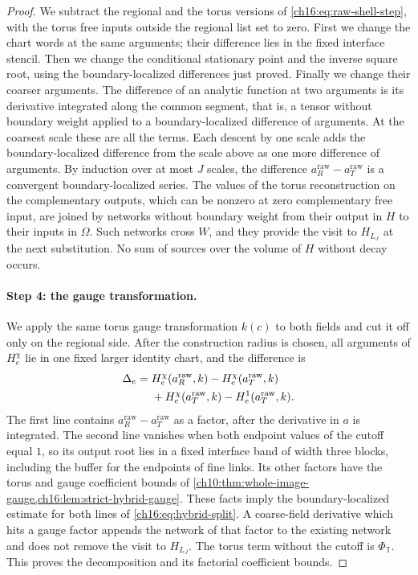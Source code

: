 \begin{proof}
We subtract the regional and the torus versions of \eqref{ch16:eq:raw-shell-step}, with the torus free inputs outside the regional list set to zero. First we change the chart words at the same arguments; their difference lies in the fixed interface stencil. Then we change the conditional stationary point and the inverse square root, using the boundary-localized differences just proved. Finally we change their coarser arguments. The difference of an analytic function at two arguments is its derivative integrated along the common segment, that is, a tensor without boundary weight applied to a boundary-localized difference of arguments. At the coarsest scale these are all the terms. Each descent by one scale adds the boundary-localized difference from the scale above as one more difference of arguments. By induction over at most $J$ scales, the difference $a_R^{\mathrm{raw}}-a_T^{\mathrm{raw}}$ is a convergent boundary-localized series. The values of the torus reconstruction on the complementary outputs, which can be nonzero at zero complementary free input, are joined by networks without boundary weight from their output in $H$ to their inputs in $\Omega$. Such networks cross $W$, and they provide the visit to $H_{L_J}$ at the next substitution. No sum of sources over the volume of $H$ without decay occurs.

\paragraph{Step 4: the gauge transformation.}
We apply the same torus gauge transformation $k(c)$ to both fields and cut it off only on the regional side. After the construction radius is chosen, all arguments of $H_e^\chi$ lie in one fixed larger identity chart, and the difference is
\begin{align}
 \Delta_e={}&H_e^\chi(a_R^{\mathrm{raw}},k)-H_e^\chi(a_T^{\mathrm{raw}},k)
                                                        \notag\\
            &+H_e^\chi(a_T^{\mathrm{raw}},k)-H_e^1(a_T^{\mathrm{raw}},k).
                                                        \label{ch16:eq:hybrid-split}
\end{align}
The first line contains $a_R^{\mathrm{raw}}-a_T^{\mathrm{raw}}$ as a factor, after the derivative in $a$ is integrated. The second line vanishes when both endpoint values of the cutoff equal $1$, so its output root lies in a fixed interface band of width three blocks, including the buffer for the endpoints of fine links. Its other factors have the torus and gauge coefficient bounds of \cref{ch10:thm:whole-image-gauge,ch16:lem:strict-hybrid-gauge}. These facts imply the boundary-localized estimate for both lines of \eqref{ch16:eq:hybrid-split}. A coarse-field derivative which hits a gauge factor appends the network of that factor to the existing network and does not remove the visit to $H_{L_J}$. The torus term without the cutoff is $\Phi_{\mathbb T}$. This proves the decomposition and its factorial coefficient bounds.


\end{proof}
